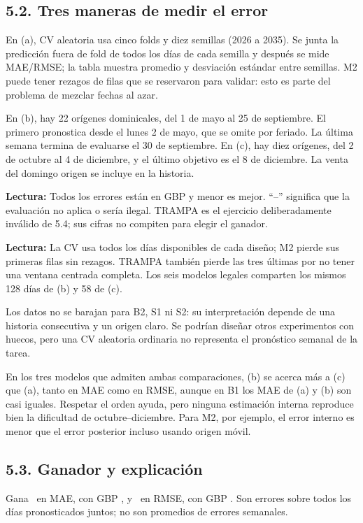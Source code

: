 \documentclass[11pt,letterpaper]{article}
\newcommand{\tabla}[2]{\begin{center}\small\textbf{Lectura:} #2\end{center}}
\begin{document}
\subsection{5.2. Tres maneras de medir el error}
En (a), CV aleatoria usa cinco folds y diez semillas (2026 a 2035). Se junta la predicción fuera de fold de todos los días de cada semilla y después se mide MAE/RMSE; la tabla muestra promedio y desviación estándar entre semillas. M2 puede tener rezagos de filas que se reservaron para validar: esto es parte del problema de mezclar fechas al azar.

En (b), hay 22 orígenes dominicales, del 1 de mayo al 25 de septiembre. El primero pronostica desde el lunes 2 de mayo, que se omite por feriado. La última semana termina de evaluarse el 30 de septiembre. En (c), hay diez orígenes, del 2 de octubre al 4 de diciembre, y el último objetivo es el 8 de diciembre. La venta del domingo origen se incluye en la historia.

\tabla{comparacion}{Todos los errores están en GBP y menor es mejor. ``--'' significa que la evaluación no aplica o sería ilegal. TRAMPA es el ejercicio deliberadamente inválido de 5.4; sus cifras no compiten para elegir el ganador.}
\tabla{muestras}{La CV usa todos los días disponibles de cada diseño; M2 pierde sus primeras filas sin rezagos. TRAMPA también pierde las tres últimas por no tener una ventana centrada completa. Los seis modelos legales comparten los mismos 128 días de (b) y 58 de (c).}
Los datos no se barajan para B2, S1 ni S2: su interpretación depende de una historia consecutiva y un origen claro. Se podrían diseñar otros experimentos con huecos, pero una CV aleatoria ordinaria no representa el pronóstico semanal de la tarea.

En los tres modelos que admiten ambas comparaciones, (b) se acerca más a (c) que (a), tanto en MAE como en RMSE, aunque en B1 los MAE de (a) y (b) son casi iguales. Respetar el orden ayuda, pero ninguna estimación interna reproduce bien la dificultad de octubre--diciembre. Para M2, por ejemplo, el error interno es menor que el error posterior incluso usando origen móvil.

\subsection{5.3. Ganador y explicación}
Gana \GanadorMAE\ en MAE, con GBP \MejorMAE, y \GanadorRMSE\ en RMSE, con GBP \MejorRMSE. Son errores sobre todos los días pronosticados juntos; no son promedios de errores semanales.
\end{document}
